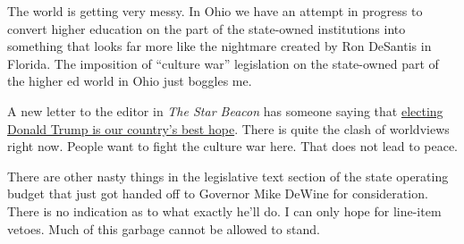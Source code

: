 The world is getting very messy. In Ohio we have an attempt in progress
to convert higher education on the part of the state-owned institutions
into something that looks far more like the nightmare created by Ron
DeSantis in Florida. The imposition of ``culture war'' legislation on
the state-owned part of the higher ed world in Ohio just boggles me.

A new letter to the editor in \emph{The Star Beacon} has someone saying
that \href{https://archive.ph/wPiK2}{electing Donald Trump is our
country's best hope}. There is quite the clash of worldviews right now.
People want to fight the culture war here. That does not lead to peace.

There are other nasty things in the legislative text section of the
state operating budget that just got handed off to Governor Mike DeWine
for consideration. There is no indication as to what exactly he'll do. I
can only hope for line-item vetoes. Much of this garbage cannot be
allowed to stand.
